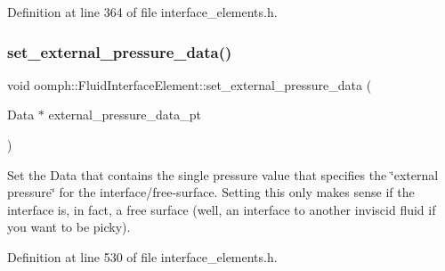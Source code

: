 Definition at line 364 of file interface\+\_\+elements.\+h.

\mbox{\label{classoomph_1_1FluidInterfaceElement_a7230ddea36eb36938d64583e5ee4b15f}} 
\subsubsection{\texorpdfstring{set\+\_\+external\+\_\+pressure\+\_\+data()}{set\_external\_pressure\_data()}\hspace{0.1cm}{\footnotesize\ttfamily [1/2]}}
{\footnotesize\ttfamily void oomph\+::\+Fluid\+Interface\+Element\+::set\+\_\+external\+\_\+pressure\+\_\+data (\begin{DoxyParamCaption}\item[{Data $\ast$}]{external\+\_\+pressure\+\_\+data\+\_\+pt }\end{DoxyParamCaption})\hspace{0.3cm}{\ttfamily [inline]}}



Set the Data that contains the single pressure value that specifies the \char`\"{}external pressure\char`\"{} for the interface/free-\/surface. Setting this only makes sense if the interface is, in fact, a free surface (well, an interface to another inviscid fluid if you want to be picky). 



Definition at line 530 of file interface\+\_\+elements.\+h.

\mbox{\label{classoomph_1_1FluidInterfaceElement_a87ee1f3227c456a4c30df77c4d0bad6b}} 
